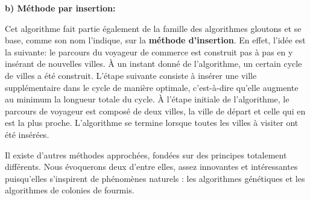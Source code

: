 \documentclass[12pt, openany]{report}
\begin{document}
\quad \textbf{b) Méthode par insertion:} 

Cet algorithme fait partie également de la famille des algorithmes gloutons et se base, comme son nom l'indique, sur la \textbf{méthode d'insertion}. En effet, l'idée est la suivante: le parcours du voyageur de commerce est construit pas à pas en y insérant de nouvelles villes. À un instant donné de l’algorithme, un certain cycle de villes a été construit. L’étape suivante consiste à insérer une ville supplémentaire dans le cycle de manière optimale, c’est-à-dire qu’elle augmente au minimum la longueur totale du cycle. À l’étape initiale de l’algorithme, le parcours de voyageur est composé de deux villes, la ville de départ et celle qui en est la plus proche. L’algorithme se termine lorsque toutes les villes à visiter ont été insérées. 

Il existe d’autres méthodes approchées, fondées sur des principes totalement différents. Nous évoquerons deux d’entre elles, assez innovantes et intéressantes puisqu’elles s’inspirent de phénomènes naturels : les algorithmes génétiques et les algorithmes de colonies de fourmis. 
\end{document}
